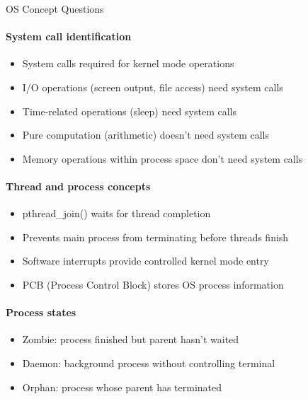\begin{KR}{OS Concept Questions}
    \paragraph{System call identification}
    \begin{itemize}
        \item System calls required for kernel mode operations
        \item I/O operations (screen output, file access) need system calls
        \item Time-related operations (sleep) need system calls
        \item Pure computation (arithmetic) doesn't need system calls
        \item Memory operations within process space don't need system calls
    \end{itemize}
    
    \paragraph{Thread and process concepts}
    \begin{itemize}
        \item pthread\_join() waits for thread completion
        \item Prevents main process from terminating before threads finish
        \item Software interrupts provide controlled kernel mode entry
        \item PCB (Process Control Block) stores OS process information
    \end{itemize}
    
    \paragraph{Process states}
    \begin{itemize}
        \item Zombie: process finished but parent hasn't waited
        \item Daemon: background process without controlling terminal
        \item Orphan: process whose parent has terminated
    \end{itemize}
\end{KR}

